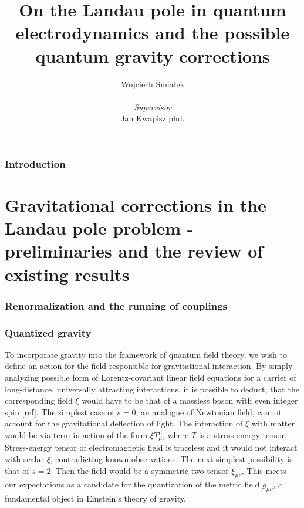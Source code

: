 \documentclass[11pt, a4paper]{article}
\title{\vspace{-2cm}On the Landau pole in quantum electrodynamics and the possible quantum gravity corrections}
\author{{Wojciech Śmiałek}\\
\\
{\textit{Supervisor}} \\
{Jan Kwapisz phd.}}
\date{}
\begin{document}
\maketitle

\section*{Introduction}

\part{Gravitational corrections in the Landau pole problem - preliminaries and the review of existing results}

\section{Renormalization and the running of couplings}

\section{Quantized gravity}

To incorporate gravity into the framework of quantum field theory, %
we wish to define an action for the field responsible for gravitational interaction.
By simply analyzing possible form of Lorentz-covariant linear field equations for a carrier of long-distance, 
universally attracting interactions, it is possible to deduct, that the corresponding field $\xi$ would have to be that of a massless boson with even integer spin [ref].
The simplest case of $s=0$, an analogue of Newtonian field, cannot account for the gravitational deflection of light.
The interaction of $\xi$ with matter would be via term in action of the form $\xi T^\mu_\mu$, where $T$ is a stress-energy tensor.
Stress-energy tensor of electromagnetic field is traceless and it would not interact with scalar $\xi$, contradicting known observations.
The next simplest possibility is that of $s=2$. Then the field would be a symmetric two-tensor $\xi_{\mu\nu}$. This meets our expectations as a
candidate for the quantization of the metric field $g_{\mu\nu}$, a fundamental object in Einstein's theory of gravity.
\end{document}
